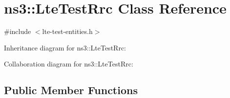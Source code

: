 \hypertarget{classns3_1_1LteTestRrc}{}\section{ns3\+:\+:Lte\+Test\+Rrc Class Reference}
\label{classns3_1_1LteTestRrc}


{\ttfamily \#include $<$lte-\/test-\/entities.\+h$>$}



Inheritance diagram for ns3\+:\+:Lte\+Test\+Rrc\+:


Collaboration diagram for ns3\+:\+:Lte\+Test\+Rrc\+:
\subsection*{Public Member Functions}
